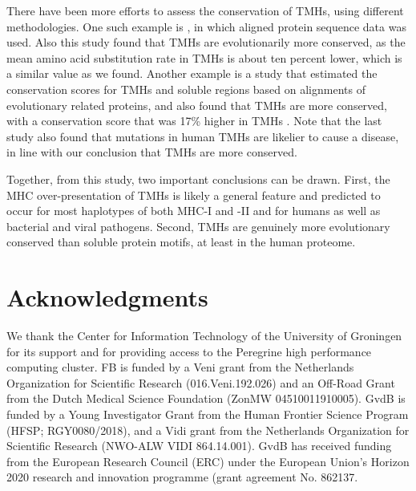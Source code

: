 There have been more efforts to assess the conservation of TMHs,
using different methodologies.
One such example is \cite{stevens2001substitution}, 
in which aligned protein sequence data was used.
Also this study found that TMHs are evolutionarily more conserved,
as the mean amino acid substitution rate in TMHs is about ten
percent lower,
which is a similar value as we found.
Another example is a study that estimated the conservation
scores for TMHs and soluble regions based on 
alignments of evolutionary related proteins,
and also found that TMHs are more conserved, 
with a conservation score that was 17\% higher in 
TMHs \cite{oberai2009structural}.
Note that the last study also found that mutations in human TMHs are likelier to cause
a disease, in line with our conclusion that TMHs are more conserved.


Together, from this study, two important conclusions can be drawn. 
First, the MHC over-presentation of TMHs is likely a general feature 
and predicted to occur for most haplotypes of both MHC-I and -II 
and for humans as well as bacterial and viral pathogens. 
Second, TMHs are genuinely more evolutionary conserved than soluble protein motifs, 
at least in the human proteome. 

\section{Acknowledgments}

We thank the Center for Information Technology of the University 
of Groningen for its support and for providing access to the Peregrine 
high performance computing cluster. 
FB is funded by a Veni grant from the Netherlands Organization for Scientific
Research (016.Veni.192.026) and an Off-Road Grant from the Dutch Medical Science Foundation (ZonMW 04510011910005).
GvdB is funded by a Young Investigator Grant from 
the Human Frontier Science Program (HFSP; RGY0080/2018), 
and a Vidi grant from 
the Netherlands Organization for Scientific Research (NWO-ALW VIDI 864.14.001). 
GvdB has received funding from the European Research Council (ERC) 
under the European Union’s Horizon 2020 research and 
innovation programme (grant agreement No. 862137. 

